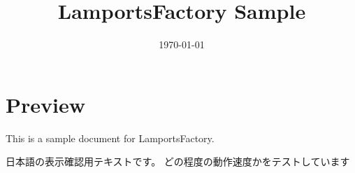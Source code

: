\documentclass{ltjsarticle}
\title{LamportsFactory Sample}
\author{}
\date{\today}
\begin{document}
\maketitle

\section{Preview}

This is a sample document for LamportsFactory.

日本語の表示確認用テキストです。
どの程度の動作速度かをテストしています
\end{document}
